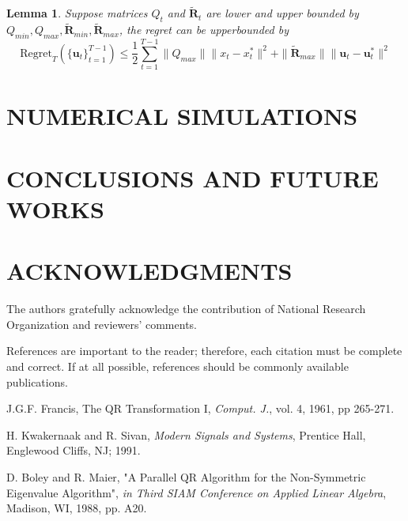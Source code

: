 \documentclass[letterpaper, 10 pt, conference]{ieeeconf}  %
\newcommand{\contTilde}[1]{\mathbf{\tilde{#1}}}
\newtheorem{lemma}{Lemma}
\begin{document}
\begin{lemma}
    Suppose matrices $Q_{t}$ and $\tilde{\mathbf{R}}_{t}$ are lower and upper bounded by $Q_{min},Q_{max},\contTilde{R}_{min},\contTilde{R}_{max}$, the regret can be upperbounded by
    \begin{equation}
        \text{Regret}_{T}(\{\mathbf{u}_{t}\}_{t=1}^{T-1}) \leq \frac{1}{2}\sum_{t=1}^{T-1} \|Q_{max}\|\|x_{t}-x_{t}^{*}\|^2 + \|\contTilde{R}_{max}\|\|\mathbf{u}_{t}-\mathbf{u}_{t}^{*}\|^2
    \end{equation}
\end{lemma}




\section{NUMERICAL SIMULATIONS}

\section{CONCLUSIONS AND FUTURE WORKS}

\section{ACKNOWLEDGMENTS}

The authors gratefully acknowledge the contribution of National Research Organization and reviewers' comments.



References are important to the reader; therefore, each citation must be complete and correct. If at all possible, references should be commonly available publications.

\begin{thebibliography}{99}

J.G.F. Francis, The QR Transformation I, {\it Comput. J.}, vol. 4, 1961, pp 265-271.

H. Kwakernaak and R. Sivan, {\it Modern Signals and Systems}, Prentice Hall, Englewood Cliffs, NJ; 1991.

D. Boley and R. Maier, "A Parallel QR Algorithm for the Non-Symmetric Eigenvalue Algorithm", {\it in Third SIAM Conference on Applied Linear Algebra}, Madison, WI, 1988, pp. A20.

\end{thebibliography}
\end{document}

